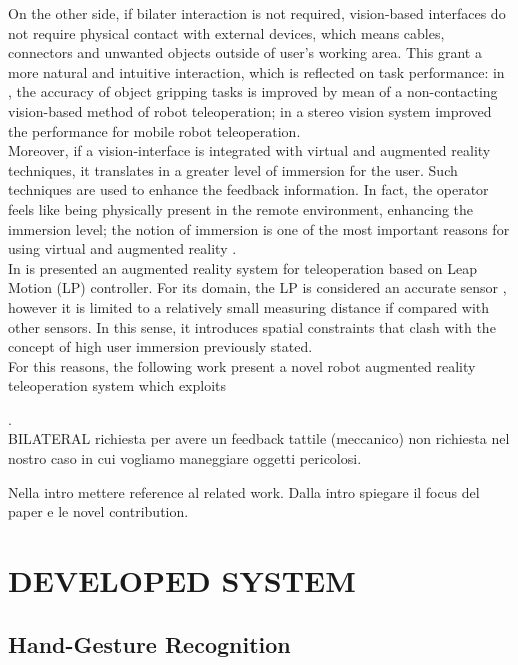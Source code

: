 \documentclass[letterpaper, 10 pt, conference]{ieeeconf}  %
\begin{document}
On the other side, if bilater interaction is not required, vision-based interfaces do not require physical contact with external devices, which means cables, connectors and unwanted objects outside of user's working area. This grant a more natural and intuitive interaction, which is reflected on task performance: in \cite{Kofman2005}, the accuracy of object gripping tasks is improved by mean of a non-contacting vision-based method of robot teleoperation; in \cite{Livatino2009} a stereo vision system improved the performance for mobile robot teleoperation.\\
Moreover, if a vision-interface is integrated with virtual and augmented reality techniques, it translates in a greater level of immersion for the user. Such techniques are used to enhance the feedback information. In fact, the operator feels like being physically present in the remote environment, enhancing the immersion level; the notion of immersion is one of the most important reasons for using virtual and augmented reality \cite{Boboc2012}.\\
In \cite{Peppoloni2015} is presented an augmented reality system for teleoperation based on Leap Motion (LP) controller. For its domain, the LP is considered an accurate sensor \cite{Hedayati2018}, however it is limited to a relatively small measuring distance if compared with other sensors. In this sense, it introduces spatial constraints that clash with the concept of high user immersion previously stated.\\
For this reasons, the following work present a novel robot augmented reality teleoperation system which exploits

.\\
BILATERAL richiesta per avere un feedback tattile (meccanico) non richiesta nel nostro caso in cui vogliamo maneggiare oggetti pericolosi.





Nella intro mettere reference al related work. Dalla intro spiegare il focus del paper e le novel contribution.

\section{DEVELOPED SYSTEM}

\subsection{Hand-Gesture Recognition}
\end{document}
